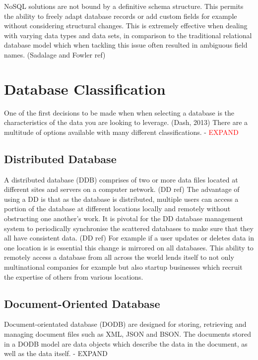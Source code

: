 NoSQL solutions are not bound by a definitive schema structure. This permits the ability to freely adapt database records or add custom fields for example without considering structural changes. This is extremely effective when dealing with varying data types and data sets, in comparison to the traditional relational database model which when tackling this issue often resulted in ambiguous field names. (Sadalage and Fowler ref)

\section{Database Classification}
One of the first decisions to be made when when selecting a database is the characteristics of the data you are looking to leverage. (Dash, 2013) There are a multitude of options available with many different classifications. - \textcolor{red}{EXPAND}

\subsection{Distributed Database}\label{distributeddb}
A distributed database (DDB) comprises of two or more data files located at different sites and servers on a computer network. (DD ref) The advantage of using a DD is that as the database is distributed, multiple users can access a portion of the database at different locations locally and remotely without obstructing one another's work. It is  pivotal for the DD database management system to periodically synchronise the scattered databases to make sure that they all have consistent data. (DD ref) For example if a user updates or deletes data in one location is is essential this change is mirrored on all databases. This ability to remotely access a database from all across the world lends itself to not only multinational companies for example but also startup businesses which recruit the expertise of others from various locations.

\subsection{Document-Oriented Database}
Document-orientated database (DODB) are designed for storing, retrieving and managing document files such as XML, JSON and BSON. The documents stored in a DODB model are data objects which describe the data in the document, as well as the data itself. - EXPAND

